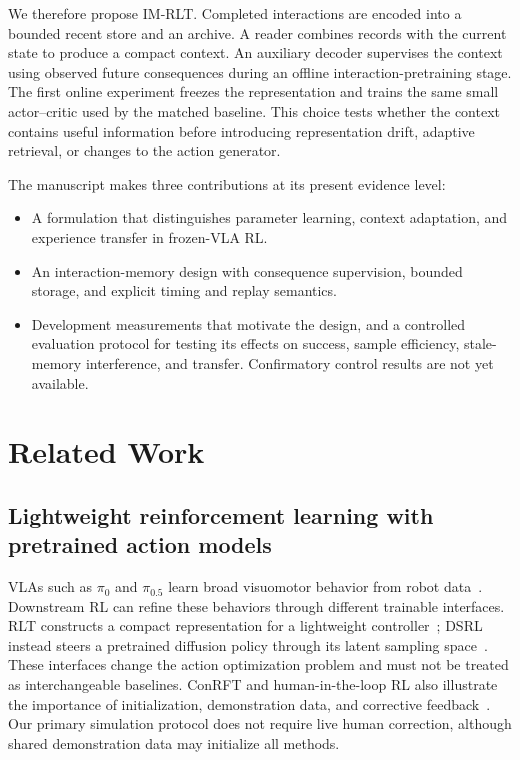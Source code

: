 \documentclass[10pt,letterpaper]{article}
\begin{document}
We therefore propose IM-RLT. Completed interactions are encoded into a bounded recent store and an archive. A reader combines records with the current state to produce a compact context. An auxiliary decoder supervises the context using observed future consequences during an offline interaction-pretraining stage. The first online experiment freezes the representation and trains the same small actor--critic used by the matched baseline. This choice tests whether the context contains useful information before introducing representation drift, adaptive retrieval, or changes to the action generator.

The manuscript makes three contributions at its present evidence level:
\begin{itemize}
\item A formulation that distinguishes parameter learning, context adaptation, and experience transfer in frozen-VLA RL.
\item An interaction-memory design with consequence supervision, bounded storage, and explicit timing and replay semantics.
\item Development measurements that motivate the design, and a controlled evaluation protocol for testing its effects on success, sample efficiency, stale-memory interference, and transfer. Confirmatory control results are not yet available.
\end{itemize}

\section{Related Work}
\label{sec:related}
\subsection{Lightweight reinforcement learning with pretrained action models}
VLAs such as $\pi_0$ and $\pi_{0.5}$ learn broad visuomotor behavior from robot data~\citep{pi0,pi05}. Downstream RL can refine these behaviors through different trainable interfaces. RLT constructs a compact representation for a lightweight controller~\citep{rlt}; DSRL instead steers a pretrained diffusion policy through its latent sampling space~\citep{dsrl}. These interfaces change the action optimization problem and must not be treated as interchangeable baselines. ConRFT and human-in-the-loop RL also illustrate the importance of initialization, demonstration data, and corrective feedback~\citep{conrft,hilserl}. Our primary simulation protocol does not require live human correction, although shared demonstration data may initialize all methods.
\end{document}
